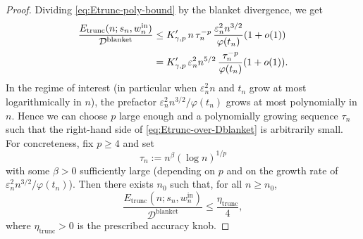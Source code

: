 \documentclass{article}
\theoremstyle{plain}
\theoremstyle{definition}
\begin{document}
\begin{proof}
Dividing \eqref{eq:Etrunc-poly-bound} by the blanket divergence, we get
\begin{align}
  \frac{E_{\mathrm{trunc}}(n;s_n,w_n^{\mathrm{in}})}{\mathcal{D}^{\mathrm{blanket}}}
  &\le
  K'_{\gamma,p}\,
  n\,\tau_n^{-p}\,
  \frac{\varepsilon_n^2 n^{3/2}}{\varphi(t_n)}
  (1+o(1))
  \notag\\
  &=
  K'_{\gamma,p}\,
  \varepsilon_n^2 n^{5/2}\,
  \frac{\tau_n^{-p}}{\varphi(t_n)}
  (1+o(1)).
  \label{eq:Etrunc-over-Dblanket}
\end{align}
In the regime of interest (in particular when $\varepsilon_n^2 n$ and
$t_n$ grow at most logarithmically in $n$), the prefactor
$\varepsilon_n^2 n^{3/2}/\varphi(t_n)$ grows at most polynomially in $n$.
Hence we can choose $p$ large enough and a polynomially growing sequence
$\tau_n$ such that the right-hand side of
\eqref{eq:Etrunc-over-Dblanket} is arbitrarily small.
For concreteness, fix $p\ge4$ and set
\begin{equation}
  \label{eq:Tn-def-poly}
  \tau_n
  :=
  n^{\beta}(\log n)^{1/p}
\end{equation}
with some $\beta>0$ sufficiently large (depending on $p$ and on the
growth rate of $\varepsilon_n^2 n^{3/2}/\varphi(t_n)$).
Then there exists $n_0$ such that, for all $n\ge n_0$,
\begin{equation}
  \label{eq:Etrunc-vs-Dblanket}
  \frac{E_{\mathrm{trunc}}(n;s_n,w_n^{\mathrm{in}})}{\mathcal{D}^{\mathrm{blanket}}}
  \le
  \frac{\eta_{\mathrm{trunc}}}{4},
\end{equation}
where $\eta_{\mathrm{trunc}}>0$ is the prescribed accuracy knob.


\medskip
\medskip


\end{proof}
\end{document}
